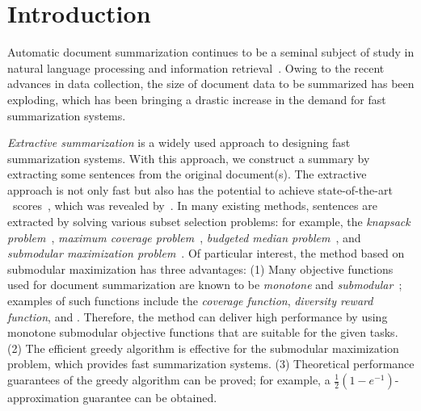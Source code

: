 \documentclass[11pt,a4paper]{article}
\begin{document}
	\newcommand{\J}{M}
	\newcommand{\cov}{\text{COV}}
	\newcommand{\counts}{\text{N}}
	\newcommand{\covr}{\text{COVR}}
	\newcommand{\countn}{\text{C}}
	
	\newcommand{\ours}{Greedy}
	\newcommand{\ilp}{ILP}
	
	\newcommand{\rset}{\rs_{1:N}}
	
	
	\section{Introduction}
	Automatic document summarization continues to be 
	a seminal subject of study 
	in natural language processing and 
	information retrieval~\cite{luhn1958automatic,edmundson1969new,cheng-lapata:2016:P16-1,peyrard-ecklekohler:2017:Long}. 
	Owing to the recent advances in data collection, 
	the size of document data to be summarized has been exploding, 
	which has been bringing a drastic increase in the demand for  
	fast summarization systems.  
	
	{\it Extractive summarization} is a widely used approach 
	to designing fast summarization systems.  
	With this approach, 
	we construct a summary by extracting some sentences 
	from the original document(s).   
	The extractive approach is not only fast but also 
	has the potential to achieve state-of-the-art \rouge\ scores~\cite{lin2004rouge},  
	which was revealed by~\citet{hirao2017enumeration}. 
	In many existing methods, 
	sentences   
	are extracted 
	by solving various subset selection problems: 
	for example, the
	{\it knapsack problem}~\cite{mcdonald2007study}, 
	{\it maximum coverage problem}~\cite{filatova2004formal,takamura2009cover},  
	{\it budgeted median problem}~\cite{takamura2009median}, 
	and {\it submodular maximization problem}~\cite{lin2010multi}. 
	Of particular interest, the method based on submodular maximization has three advantages: 
	(1) Many objective functions used for document summarization are known to be {\it monotone} and {\it submodular}~\cite{lin2011class,jkurisinkel-EtAl:2016:N16-2}; 
	examples of such functions include 
	the {\it coverage function}, {\it diversity reward function}, and \rouge. 
	Therefore, 
	the method can deliver high performance 
	by using monotone submodular objective functions 
	that are suitable for the given tasks. 
	(2) The efficient greedy algorithm is effective for the submodular maximization problem, 
	which provides fast summarization systems. 
	(3) Theoretical performance guarantees of the greedy algorithm can be proved; 
	for example, a $\frac{1}{2}(1-e^{-1})$-approximation guarantee can be obtained.  
	
\end{document}
